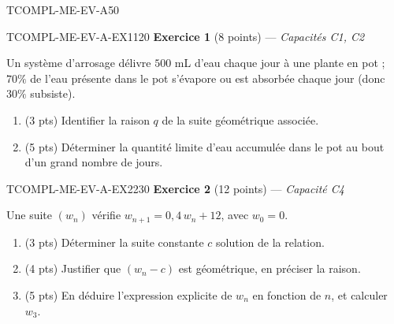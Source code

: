 

\begin{evaluation}{TCOMPL-ME-EV-A}{50}

\begin{exercice}{TCOMPL-ME-EV-A-EX1}{1}{20}
\textbf{Exercice 1} (8 points) --- \textit{Capacités C1, C2}

\medskip

Un système d'arrosage délivre $500$ mL d'eau chaque jour à une plante en pot ; $70\%$ de l'eau présente dans le pot s'évapore ou est absorbée chaque jour (donc $30\%$ subsiste).
\begin{enumerate}
  \item (3 pts) Identifier la raison $q$ de la suite géométrique associée.
  \item (5 pts) Déterminer la quantité limite d'eau accumulée dans le pot au bout d'un grand nombre de jours.
\end{enumerate}
\end{exercice}

\begin{exercice}{TCOMPL-ME-EV-A-EX2}{2}{30}
\textbf{Exercice 2} (12 points) --- \textit{Capacité C4}

\medskip

Une suite $(w_n)$ vérifie $w_{n+1} = 0{,}4\,w_n + 12$, avec $w_0=0$.
\begin{enumerate}
  \item (3 pts) Déterminer la suite constante $c$ solution de la relation.
  \item (4 pts) Justifier que $(w_n - c)$ est géométrique, en préciser la raison.
  \item (5 pts) En déduire l'expression explicite de $w_n$ en fonction de $n$, et calculer $w_3$.
\end{enumerate}
\end{exercice}

\end{evaluation}
